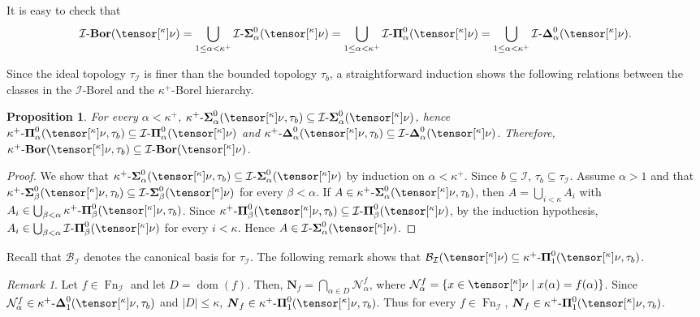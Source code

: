 \documentclass{amsart}
\numberwithin{equation}{section}
\newcommand{\B}{\mathcal{B}}
\newcommand{\I}{\mathcal{I}}
\newcommand{\N}{\mathcal{N}}
\newcommand{\pre}[2]{\tensor[^{#1}]{#2}{}}
\newcommand{\Nbhd}{\boldsymbol{N}}
\newcommand{\1}{\mathbf{I}}
\newcommand{\2}{\mathbf{II}}
\newcommand{\Bor}{\k^+\text{-}\mathbf{Bor}}
\newcommand{\Sii}[2]{\k^+\text{-}\boldsymbol{\Sigma}^{ #1 }_{ #2}}
\newcommand{\Pii}[2]{\k^+\text{-}\boldsymbol{\Pi}^{ #1 }_{ #2 }}
\newcommand{\Dee}[2]{\k^+\text{-}\boldsymbol{\Delta}^{ #1 }_{ #2}}
\newcommand{\Borid}{\I\text{-}\mathbf{Bor}}
\newcommand{\Siid}[2]{\I\text{-}\boldsymbol{\Sigma}^{ #1 }_{ #2}}
\newcommand{\Piid}[2]{\I\text{-}\boldsymbol{\Pi}^{ #1 }_{ #2 }}
\newcommand{\Deid}[2]{\I\text{-}\boldsymbol{\Delta}^{ #1 }_{ #2}}
\renewcommand{\a}{\alpha}
\renewcommand{\b}{\beta}
\renewcommand{\k}{\kappa}
\DeclareMathOperator{\dom}{dom}
\DeclareMathOperator{\Fn}{Fn}
\newcommand{\clopen}[1]{\Nbhd_{#1}}
\newtheorem{proposition}[theorem]{Proposition}
\theoremstyle{definition}
\theoremstyle{remark}
\newtheorem{remark}[theorem]{Remark}
\begin{document}
It is easy to check that
\begin{align}\label{hierarchy_union}
\Borid(\pre{\k}{\nu}) = \bigcup_{1 \leq \alpha < \k^+} \Siid{0}{\a}(\pre{\k}{\nu}) = \bigcup_{1 \leq \alpha < \k^+} \Piid{0}{\a}(\pre{\k}{\nu})   = \bigcup_{1 \leq \alpha < \k^+} \Deid{0}{\a}(\pre{\k}{\nu}).
\end{align}




Since the ideal topology \(\tau_\I\) is finer than the bounded topology \(\tau_b\), a straightforward induction shows the following relations between the classes in the \(\I\)-Borel and the \(\k^+\)-Borel hierarchy.
\begin{proposition}\label{prop: relatioship1} 
For every \(\a<\k^+\), \(\Sii{0}{\a}(\pre{\k}{\nu}, \tau_b) \subseteq \Siid{0}{\a}(\pre{\k}{\nu})\),  hence \\ \(\Pii{0}{\a}(\pre{\k}{\nu}, \tau_b) \subseteq \Piid{0}{\a}(\pre{\k}{\nu}) \) and \(\Dee{0}{\a}(\pre{\k}{\nu}, \tau_b) \subseteq \Deid{0}{\a}(\pre{\k}{\nu})\). Therefore,\\ \(\Bor(\pre{\k}{\nu}, \tau_b) \subseteq \Borid(\pre{\k}{\nu})\). 
\end{proposition}
\begin{proof}
We show that \(\Sii{0}{\a}(\pre{\k}{\nu}, \tau_b) \subseteq \Siid{0}{\a}(\pre{\k}{\nu})\) by induction on \(\a<\k^+\). Since \(b\subseteq \I\), \(\tau_b \subseteq \tau_\I\). Assume \(\a>1\) and that \(\Sii{0}{\b}(\pre{\k}{\nu}, \tau_b) \subseteq \Siid{0}{\b}(\pre{\k}{\nu})\) for every \(\b<\a\). If \(A \in \Sii{0}{\a}(\pre{\k}{\nu}, \tau_b)\), then \(A=\bigcup_{i<\k}A_i\) with \(A_i \in \bigcup_{\b<\a}\Pii{0}{\b}(\pre{\k}{\nu}, \tau_b)\). Since \( \Pii{0}{\b}(\pre{\k}{\nu}, \tau_b) \subseteq \Piid{0}{\b}(\pre{\k}{\nu})\), by the induction hypothesis, \(A_i \in \bigcup_{\b<\a}\Piid{0}{\b}(\pre{\k}{\nu})\) for every \(i<\k\). Hence \(A \in \Siid{0}{\a}(\pre{\k}{\nu})\).
\end{proof}

Recall that \(\B_\I\) denotes the canonical basis for \(\tau_\I\). The following remark shows that \(\B_\I(\pre{\k}{\nu}) \subseteq \Pii{0}{1}(\pre{\k}{\nu}, \tau_b)\).
\begin{remark}\label{rmk: relatioship2} Let \(f \in \Fn_{\I}\) and let \(D =\dom(f)\). 
Then, \(\clopen{f}=\bigcap_{\a \in D} \N^f_\a\), where \(\N^f_\a=\{x \in \pre{\k}{\nu} \mid x(\a)=f(\a)\}\). 
Since \(\N^f_\a \in \Dee{0}{1}(\pre{\k}{\nu}, \tau_b)\) and \(|D|\leq \k\), \(\clopen{f} \in \Pii{0}{1}(\pre{\k}{\nu}, \tau_b)\). 
Thus for every \(f \in \Fn_{\I}\),  \(\clopen{f} \in \Pii{0}{1}(\pre{\k}{\nu}, \tau_b)\).
\end{remark}
\end{document}
